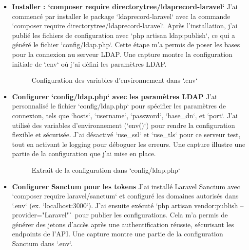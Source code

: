 \begin{itemize}
    \item \textbf{Installer : `composer require directorytree/ldaprecord-laravel`}  
      J’ai commencé par installer le package `ldaprecord-laravel` avec la commande `composer require directorytree/ldaprecord-laravel`. Après l’installation, j’ai publié les fichiers de configuration avec `php artisan ldap:publish`, ce qui a généré le fichier `config/ldap.php`. Cette étape m’a permis de poser les bases pour la connexion au serveur LDAP. Une capture montre la configuration initiale de `.env` où j’ai défini les paramètres LDAP.
      
      \begin{figure}[h]
          \centering
          \caption{Configuration des variables d’environnement dans `.env`}
          \label{fig:ldap_env_config}
      \end{figure}
      
    \item \textbf{Configurer `config/ldap.php` avec les paramètres LDAP}  
      J’ai personnalisé le fichier `config/ldap.php` pour spécifier les paramètres de connexion, tels que `hosts`, `username`, `password`, `base\_dn`, et `port`. J’ai utilisé des variables d’environnement (`env()`) pour rendre la configuration flexible et sécurisée. J’ai désactivé `use\_ssl` et `use\_tls` pour ce serveur test, tout en activant le logging pour déboguer les erreurs. Une capture illustre une partie de la configuration que j’ai mise en place.
      
      \begin{figure}[h]
          \centering
          \caption{Extrait de la configuration dans `config/ldap.php`}
          \label{fig:ldap_config_file}
      \end{figure}
      
    \item \textbf{Configurer Sanctum pour les tokens}  
      J’ai installé Laravel Sanctum avec `composer require laravel/sanctum` et configuré les domaines autorisés dans `.env` (ex. `localhost:3000`). J’ai ensuite exécuté `php artisan vendor:publish --provider="Laravel\Sanctum\SanctumServiceProvider"` pour publier les configurations. Cela m’a permis de générer des jetons d’accès après une authentification réussie, sécurisant les endpoints de l’API. Une capture montre une partie de la configuration Sanctum dans `.env`.
      

\end{itemize}
